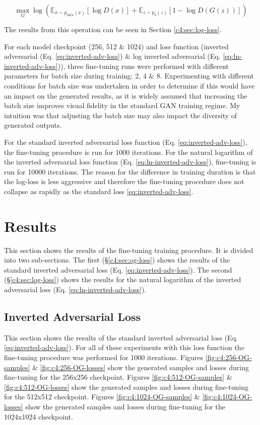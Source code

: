 \begin{equation} 
  \max_{G}\log(\mathbb{E}_{x\sim p_{\text{data}}(x)}[\log{D(x)}] +  \mathbb{E}_{z\sim p_{\text{z}}(z)}[1 - \log{D(G(z))}])
  \label{eq:ln-inverted-adv-loss}
  \end{equation}

The results from this operation can be seen in Section \ref{c4:sec:log-loss}.

For each model checkpoint (256, 512 \& 1024) and loss function (inverted adversarial (Eq. \ref{eq:inverted-adv-loss}) \& log inverted adversarial (Eq. \ref{eq:ln-inverted-adv-loss})), three fine-tuning runs were performed with different parameters for batch size during training: 2, 4 \& 8.
Experimenting with different conditions for batch size was undertaken in order to determine if this would have an impact on the generated results, as it is widely assumed that increasing the batch size improves visual fidelity in the standard GAN training regime. 
My intuition was that adjusting the batch size may also impact the diversity of generated outputs.

For the standard inverted adversarial loss function (Eq. \ref{eq:inverted-adv-loss}), the fine-tuning procedure is run for 1000 iterations.
For the natural logarithm of the inverted adversarial loss function (Eq. \ref{eq:ln-inverted-adv-loss}), fine-tuning is run for 10000 iterations.
The reason for the difference in training duration is that the log-loss is less aggressive and therefore the fine-tuning procedure does not collapse as rapidly as the standard loss \ref{eq:inverted-adv-loss}.

\section{Results}
\label{c4:sec:results}

This section shows the results of the fine-tuning training procedure. 
It is divided into two sub-sections.
The first (\S \ref{c4:sec:og-loss}) shows the results of the standard inverted adversarial loss (Eq. \ref{eq:inverted-adv-loss}).
The second (\S \ref{c4:sec:log-loss}) shows the results for the natural logarithm of the inverted adversarial loss (Eq. \ref{eq:ln-inverted-adv-loss}).

\subsection{Inverted Adversarial Loss}
\FloatBarrier

This section shows the results of the standard inverted adversarial loss (Eq. \ref{eq:inverted-adv-loss}). For all of these experiments with this loss function the fine-tuning procedure was performed for 1000 iterations.
Figures \ref{fig:c4:256-OG-samples} \& \ref{fig:c4:256-OG-losses} show the generated samples and losses during fine-tuning for the 256x256 checkpoint.
Figures \ref{fig:c4:512-OG-samples} \& \ref{fig:c4:512-OG-losses} show the generated samples and losses during fine-tuning for the 512x512 checkpoint.
Figures \ref{fig:c4:1024-OG-samples} \& \ref{fig:c4:1024-OG-losses} show the generated samples and losses during fine-tuning for the 1024x1024 checkpoint.

